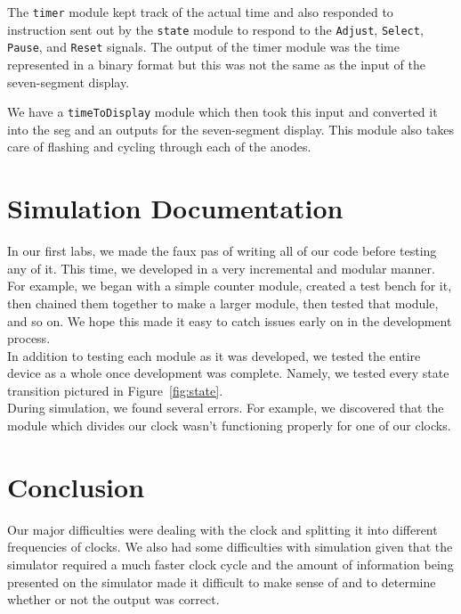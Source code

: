 \documentclass[]{article}
\begin{document}
The \texttt{timer} module kept track of the actual time and also responded to instruction sent out by the \texttt{state} module to respond to the \texttt{Adjust}, \texttt{Select}, \texttt{Pause}, and \texttt{Reset} signals. The output of the timer module was the time represented in a binary format but this was not the same as the input of the seven-segment display.

We have a \texttt{timeToDisplay} module which then took this input and converted it into the seg and an outputs for the seven-segment display. This module also takes care of flashing and cycling through each of the anodes.

\section{Simulation Documentation}

In our first labs, we made the faux pas of writing all of our code before testing any of it. This time, we developed in a very incremental and modular manner. For example, we began with a simple counter module, created a test bench for it, then chained them together to make a larger module, then tested that module, and so on. We hope this made it easy to catch issues early on in the development process.\\

In addition to testing each module as it was developed, we tested the entire device as a whole once development was complete. Namely, we tested every state transition pictured in Figure~\ref{fig:state}.\\

During simulation, we found several errors. For example, we discovered that the module which divides our clock wasn't functioning properly for one of our clocks.

\section{Conclusion}

Our major difficulties were dealing with the clock and splitting it into different frequencies of clocks. We also had some difficulties with simulation given that the simulator required a much faster clock cycle and the amount of information being presented on the simulator made it difficult to make sense of and to determine whether or not the output was correct.
\end{document}
